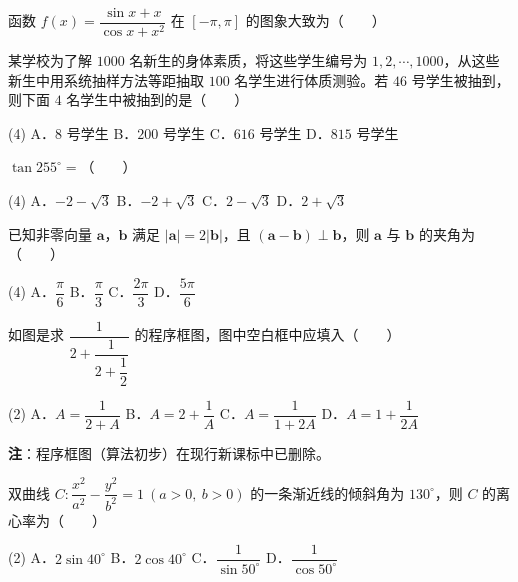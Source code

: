 函数 $f(x)=\dfrac{\sin x+x}{\cos x+x^{2}}$ 在 $[-\pi,\pi]$ 的图象大致为（　　）

\begin{center}\end{center}

某学校为了解 $1000$ 名新生的身体素质，将这些学生编号为 $1,2,\cdots,1000$，从这些新生中用系统抽样方法等距抽取 $100$ 名学生进行体质测验。若 $46$ 号学生被抽到，则下面 $4$ 名学生中被抽到的是（　　）

\begin{gkopts}(4)
\task A．$8$ 号学生
\task B．$200$ 号学生
\task C．$616$ 号学生
\task D．$815$ 号学生
\end{gkopts}

$\tan255^\circ=$（　　）

\begin{gkopts}(4)
\task A．$-2-\sqrt3$
\task B．$-2+\sqrt3$
\task C．$2-\sqrt3$
\task D．$2+\sqrt3$
\end{gkopts}

已知非零向量 $\boldsymbol a$，$\boldsymbol b$ 满足 $|\boldsymbol a|=2|\boldsymbol b|$，且 $(\boldsymbol a-\boldsymbol b)\perp\boldsymbol b$，则 $\boldsymbol a$ 与 $\boldsymbol b$ 的夹角为（　　）

\begin{gkopts}(4)
\task A．$\dfrac\pi6$
\task B．$\dfrac\pi3$
\task C．$\dfrac{2\pi}3$
\task D．$\dfrac{5\pi}6$
\end{gkopts}

如图是求 $\dfrac1{2+\dfrac1{2+\dfrac12}}$ 的程序框图，图中空白框中应填入（　　）

\begin{center}\end{center}

\begin{gkopts}(2)
\task A．$A=\dfrac1{2+A}$
\task B．$A=2+\dfrac1A$
\task C．$A=\dfrac1{1+2A}$
\task D．$A=1+\dfrac1{2A}$
\end{gkopts}

\begin{gktip}
\textbf{注}：程序框图（算法初步）在现行新课标中已删除。
\end{gktip}

双曲线 $C:\dfrac{x^{2}}{a^{2}}-\dfrac{y^{2}}{b^{2}}=1\ (a>0,\ b>0)$ 的一条渐近线的倾斜角为 $130^\circ$，则 $C$ 的离心率为（　　）

\begin{gkopts}(2)
\task A．$2\sin40^\circ$
\task B．$2\cos40^\circ$
\task C．$\dfrac1{\sin50^\circ}$
\task D．$\dfrac1{\cos50^\circ}$
\end{gkopts}

